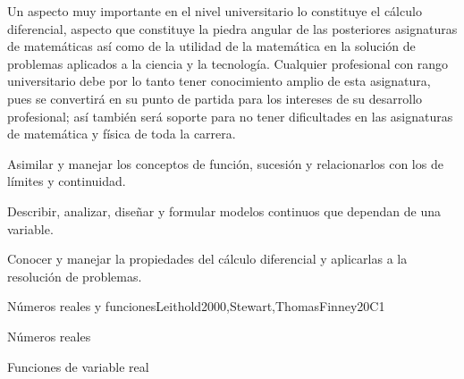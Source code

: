 \begin{syllabus}


\begin{justification}
Un aspecto muy importante en el nivel universitario lo constituye el cálculo diferencial,  aspecto que constituye la piedra angular de las posteriores asignaturas de matemáticas así como de la utilidad de la matemática en la solución de problemas aplicados a la ciencia y la tecnología. Cualquier profesional con rango universitario debe por lo tanto tener conocimiento amplio de esta asignatura, pues se convertirá en su punto de partida para los intereses de su desarrollo profesional; así también será soporte para no tener dificultades en las asignaturas de matemática y física de toda la carrera.
\end{justification}

\begin{goals}
\item Asimilar y manejar los conceptos de función, sucesión y relacionarlos con los de límites y continuidad.
\item Describir, analizar, diseñar y formular modelos continuos que dependan de una variable.
\item Conocer y manejar la propiedades del cálculo diferencial y aplicarlas a la resolución de problemas.
\end{goals}

\begin{outcomes}
    \item {}
    \item {}
\end{outcomes}

\begin{competences}
    \item {}
    \item {}
    \item {}
\end{competences}

\begin{unit}{}{Números reales y funciones}{Leithold2000,Stewart,ThomasFinney}{20}{C1}
   \begin{topics}
      \item Números reales
      \item Funciones de variable real
   \end{topics}


\end{unit}
\end{syllabus}

